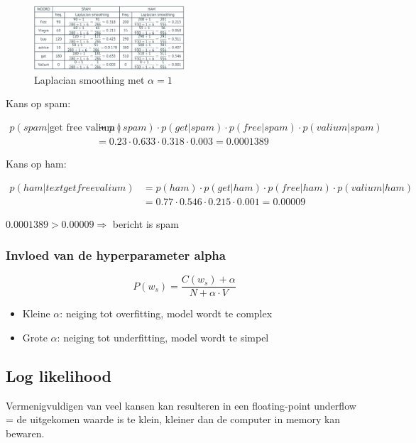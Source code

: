 \documentclass{article}
\begin{document}
\begin{figure}[H]
    \centering
    \includegraphics[width=0.5\textwidth]{laplacian-smoothing-1.png}
    \caption{Laplacian smoothing met $\alpha = 1$}
\end{figure}

Kans op spam:

\begin{align*}
    p(spam | \text{get free valium}) & = p(spam) \cdot p(get|spam) \cdot p(free|spam) \cdot p(valium | spam)\\
    & = 0.23 \cdot 0.633 \cdot 0.318 \cdot 0.003 = 0.0001389
\end{align*}

Kans op ham:

\begin{align*}
    p(ham | text{get free valium}) & = p(ham) \cdot p(get|ham) \cdot p(free|ham) \cdot p(valium | ham)\\
    & = 0.77 \cdot 0.546 \cdot 0.215 \cdot 0.001 = 0.00009
\end{align*}

$0.0001389 > 0.00009 \Rightarrow$ bericht is spam

\subsubsection{Invloed van de hyperparameter alpha}

\begin{equation*}
    P(w_s) = \frac{C(w_s) + \alpha}{N + \alpha \cdot V}
\end{equation*}

\begin{itemize}
    \item Kleine $\alpha$: neiging tot overfitting, model wordt te complex
    \item Grote $\alpha$: neiging tot underfitting, model wordt te simpel
\end{itemize}

\subsection{Log likelihood}

Vermenigvuldigen van veel kansen kan resulteren in een floating-point underflow
= de uitgekomen waarde is te klein, kleiner dan de computer in memory kan bewaren.
\end{document}
